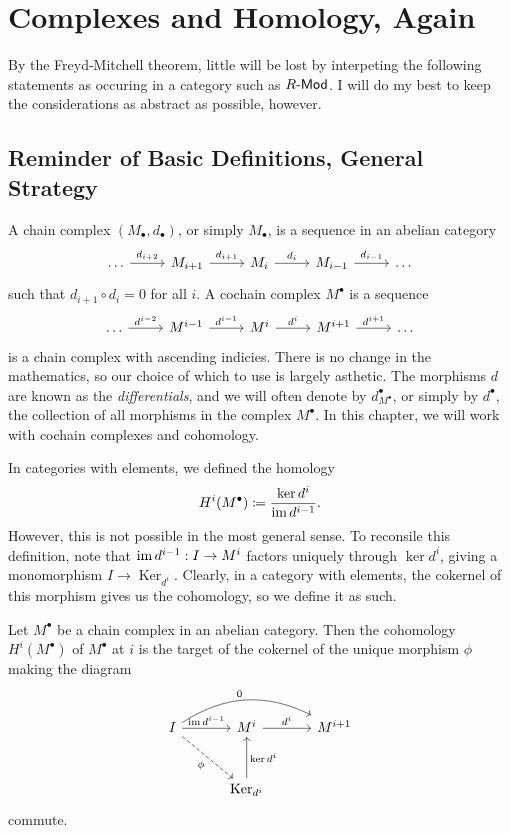 \section{Complexes and Homology, Again}
By the Freyd-Mitchell theorem, little will be lost by interpeting the following statements as occuring in a category such as $R\text{-}\mathsf{Mod} $. I will do my best to keep the considerations as abstract as possible, however.

\subsection{Reminder of Basic Definitions, General Strategy}
A chain complex $(M_\bullet ,d_\bullet )$, or simply $M_\bullet $, is a sequence in an abelian category
\[\begin{tikzcd}[row sep = 2.5em, column sep = 2.5em]
	\ldots \arrow[r, "d_{i+2} "]&M_{i+1} \arrow[r, "d_{i+1} "]&M_i\arrow[r, "d_{i} "]&M_{i-1} \arrow[r, "d_{i-1} "]&\ldots 
\end{tikzcd}\]
such that $d_{i+1} \circ d_i=0$ for all $i$. A cochain complex $M^\bullet $ is a sequence
\[\begin{tikzcd}[row sep = 2.5em, column sep = 2.5em]
	\ldots \arrow[r, "d^{i-2} "]&M^{i-1} \arrow[r, "d^{i-1} "]&M^i\arrow[r, "d^{i} "]&M^{i+1} \arrow[r, "d^{i+1} "]&\ldots 
\end{tikzcd}\]
is a chain complex with ascending indicies. There is no change in the mathematics, so our choice of which to use is largely asthetic. The morphisms $d$ are known as the \emph{differentials}, and we will often denote by $d^\bullet _{M^\bullet } $, or simply by $d^\bullet $, the collection of all morphisms in the complex $M^\bullet $. In this chapter, we will work with cochain complexes and cohomology.

In categories with elements, we defined the homology
\[
	H^i(M^\bullet )\coloneqq \frac{\ker d^i}{\operatorname{im} d^{i-1} } 
.\]
However, this is not possible in the most general sense. To reconsile this definition, note that $\operatorname{im} d^{i-1} : I \to M^i$ factors uniquely through $\ker d^i$, giving a monomorphism $I\to \operatorname{Ker}_{d^i} $. Clearly, in a category with elements, the cokernel of this morphism gives us the cohomology, so we define it as such.
\begin{definition}[(Co)Homology]\label{dfn:9.3.1}
	Let $M^{\bullet } $ be a chain complex in an abelian category. Then the cohomology $H^i(M^{\bullet } )$ of $M^\bullet $ at $i$ is the target of the cokernel of the unique morphism $\phi $ making the diagram
	\[\begin{tikzcd}[row sep = 3em, column sep = 3em]
		I\arrow[r, "\im d^{i-1} "]\ar[rr, bend left, "0"]\arrow[dr, dashed, "\phi "']&M^i\arrow[r, "d^{i} "]&M^{i+1} \\
								    &\operatorname{Ker}_{d^i} \arrow[u, "\ker d^i"']
	\end{tikzcd}\]
	commute.
\end{definition}

